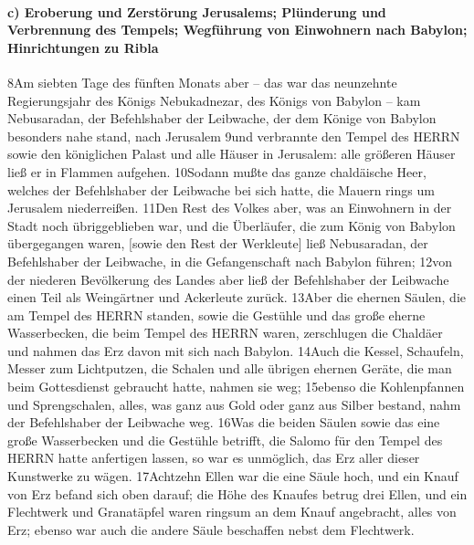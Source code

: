 \hypertarget{c-eroberung-und-zerstuxf6rung-jerusalems-pluxfcnderung-und-verbrennung-des-tempels-wegfuxfchrung-von-einwohnern-nach-babylon-hinrichtungen-zu-ribla}{%
\paragraph{c) Eroberung und Zerstörung Jerusalems; Plünderung und
Verbrennung des Tempels; Wegführung von Einwohnern nach Babylon;
Hinrichtungen zu
Ribla}\label{c-eroberung-und-zerstuxf6rung-jerusalems-pluxfcnderung-und-verbrennung-des-tempels-wegfuxfchrung-von-einwohnern-nach-babylon-hinrichtungen-zu-ribla}}

8Am siebten Tage des fünften Monats aber -- das war das neunzehnte
Regierungsjahr des Königs Nebukadnezar, des Königs von Babylon -- kam
Nebusaradan, der Befehlshaber der Leibwache, der dem Könige von Babylon
besonders nahe stand, nach Jerusalem 9und verbrannte den Tempel des
HERRN sowie den königlichen Palast und alle Häuser in Jerusalem: alle
größeren Häuser ließ er in Flammen aufgehen. 10Sodann mußte das ganze
chaldäische Heer, welches der Befehlshaber der Leibwache bei sich hatte,
die Mauern rings um Jerusalem niederreißen. 11Den Rest des Volkes aber,
was an Einwohnern in der Stadt noch übriggeblieben war, und die
Überläufer, die zum König von Babylon übergegangen waren, {[}sowie den
Rest der Werkleute{]} ließ Nebusaradan, der Befehlshaber der Leibwache,
in die Gefangenschaft nach Babylon führen; 12von der niederen
Bevölkerung des Landes aber ließ der Befehlshaber der Leibwache einen
Teil als Weingärtner und Ackerleute zurück. 13Aber die ehernen Säulen,
die am Tempel des HERRN standen, sowie die Gestühle und das große eherne
Wasserbecken, die beim Tempel des HERRN waren, zerschlugen die Chaldäer
und nahmen das Erz davon mit sich nach Babylon. 14Auch die Kessel,
Schaufeln, Messer zum Lichtputzen, die Schalen und alle übrigen ehernen
Geräte, die man beim Gottesdienst gebraucht hatte, nahmen sie weg;
15ebenso die Kohlenpfannen und Sprengschalen, alles, was ganz aus Gold
oder ganz aus Silber bestand, nahm der Befehlshaber der Leibwache weg.
16Was die beiden Säulen sowie das eine große Wasserbecken und die
Gestühle betrifft, die Salomo für den Tempel des HERRN hatte anfertigen
lassen, so war es unmöglich, das Erz aller dieser Kunstwerke zu wägen.
17Achtzehn Ellen war die eine Säule hoch, und ein Knauf von Erz befand
sich oben darauf; die Höhe des Knaufes betrug drei Ellen, und ein
Flechtwerk und Granatäpfel waren ringsum an dem Knauf angebracht, alles
von Erz; ebenso war auch die andere Säule beschaffen nebst dem
Flechtwerk.

